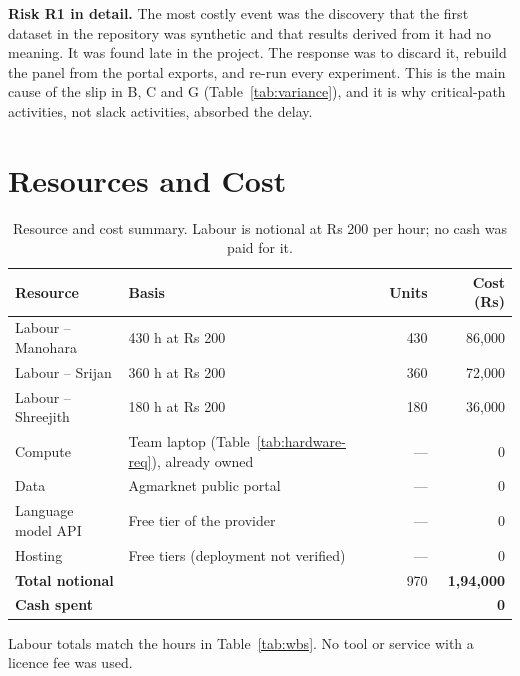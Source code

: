 \noindent\textbf{Risk R1 in detail.} The most costly event was the discovery that the first dataset in the repository was synthetic and that results derived from it had no meaning. It was found late in the project. The response was to discard it, rebuild the panel from the portal exports, and re-run every experiment. This is the main cause of the slip in B, C and G (Table~\ref{tab:variance}), and it is why critical-path activities, not slack activities, absorbed the delay.

\section{Resources and Cost}
\label{sec:cost}

\begin{table}[!t]
\centering
\caption{Resource and cost summary. Labour is notional at Rs 200 per hour; no cash was paid for it.}
\label{tab:cost}
\small
\begin{tabular}{|l|p{6.2cm}|r|r|}
\hline
\textbf{Resource} & \textbf{Basis} & \textbf{Units} & \textbf{Cost (Rs)} \\ \hline
Labour -- Manohara & 430 h at Rs 200 & 430 & 86,000 \\ \hline
Labour -- Srijan & 360 h at Rs 200 & 360 & 72,000 \\ \hline
Labour -- Shreejith & 180 h at Rs 200 & 180 & 36,000 \\ \hline
Compute & Team laptop (Table~\ref{tab:hardware-req}), already owned & --- & 0 \\ \hline
Data & Agmarknet public portal & --- & 0 \\ \hline
Language model API & Free tier of the provider & --- & 0 \\ \hline
Hosting & Free tiers (deployment not verified) & --- & 0 \\ \hline
\textbf{Total notional} & & 970 & \textbf{1,94,000} \\ \hline
\textbf{Cash spent} & & & \textbf{0} \\ \hline
\end{tabular}
\end{table}

Labour totals match the hours in Table~\ref{tab:wbs}. No tool or service with a licence fee was used.
